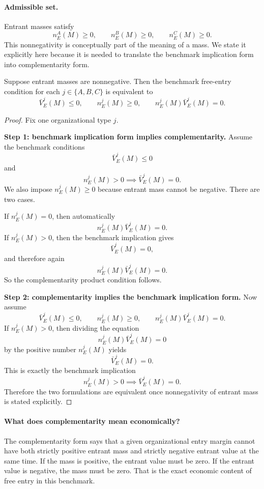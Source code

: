 \paragraph{Admissible set.}
Entrant masses satisfy
\[
n_E^A(M)\ge 0,\qquad n_E^B(M)\ge 0,\qquad n_E^C(M)\ge 0.
\]
This nonnegativity is conceptually part of the meaning of a mass. We state it explicitly here because it is needed to translate the benchmark implication form into complementarity form.

\begin{proposition}
Suppose entrant masses are nonnegative. Then the benchmark free-entry condition for each $j\in\{A,B,C\}$ is equivalent to
\[
\bar V_E^j(M)\le 0,\qquad n_E^j(M)\ge 0,\qquad n_E^j(M)\bar V_E^j(M)=0.
\]
\end{proposition}

\begin{proof}
Fix one organizational type $j$.

\medskip\noindent\textbf{Step 1: benchmark implication form implies complementarity.}
Assume the benchmark conditions
\[
\bar V_E^j(M)\le 0
\]
and
\[
n_E^j(M)>0\implies \bar V_E^j(M)=0.
\]
We also impose $n_E^j(M)\ge 0$ because entrant mass cannot be negative. There are two cases.

If $n_E^j(M)=0$, then automatically
\[
n_E^j(M)\bar V_E^j(M)=0.
\]
If $n_E^j(M)>0$, then the benchmark implication gives
\[
\bar V_E^j(M)=0,
\]
and therefore again
\[
n_E^j(M)\bar V_E^j(M)=0.
\]
So the complementarity product condition follows.

\medskip\noindent\textbf{Step 2: complementarity implies the benchmark implication form.}
Now assume
\[
\bar V_E^j(M)\le 0,\qquad n_E^j(M)\ge 0,\qquad n_E^j(M)\bar V_E^j(M)=0.
\]
If $n_E^j(M)>0$, then dividing the equation
\[
n_E^j(M)\bar V_E^j(M)=0
\]
by the positive number $n_E^j(M)$ yields
\[
\bar V_E^j(M)=0.
\]
This is exactly the benchmark implication
\[
n_E^j(M)>0\implies \bar V_E^j(M)=0.
\]
Therefore the two formulations are equivalent once nonnegativity of entrant mass is stated explicitly.
\end{proof}

\paragraph{What does complementarity mean economically?}
The complementarity form says that a given organizational entry margin cannot have both strictly positive entrant mass and strictly negative entrant value at the same time. If the mass is positive, the entrant value must be zero. If the entrant value is negative, the mass must be zero. That is the exact economic content of free entry in this benchmark.

